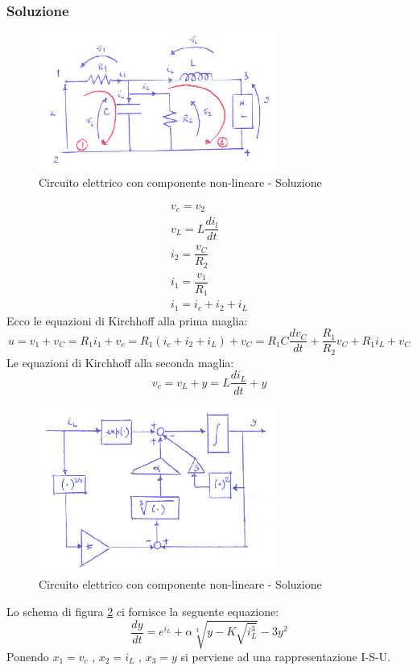 \documentclass[a4paper]{report}
\begin{document}
\subsubsection{Soluzione}
\begin{figure}[!t]
  \centering
  \includegraphics[width=0.7\textwidth]{./images/esempio03-3.png}
  \caption{Circuito elettrico con componente non-lineare - Soluzione\label{fig:esempio03-3}}
\end{figure}
\[
  \begin{array}{l}
    v_c = v_2\\
    v_L = L \dfrac{di_l}{dt}\\
    i_2 = \dfrac{v_C}{R_2}\\
    i_1 = \dfrac{v_1}{R_1}\\
    i_1 = i_c + i_2 + i_L
  \end{array}
\]
Ecco le equazioni di Kirchhoff alla prima maglia:
\[
  u = v_1 + v_C = R_1i_1 + v_c = R_1 (i_c + i_2 + i_L) + v_C = R_1C
  \dfrac{dv_C}{dt} + \dfrac{R_1}{R_2}v_C + R_1i_L + v_C
\]
Le equazioni di Kirchhoff alla seconda maglia:
\[
v_c = v_L + y = L \dfrac{di_L}{dt} + y
\]
\begin{figure}[!t]
  \centering
  \includegraphics[width=0.7\textwidth]{./images/esempio03-4.png}
  \caption{Circuito elettrico con componente non-lineare - Soluzione\label{fig:esempio03-4}}
\end{figure}
Lo schema di figura \ref{fig:esempio03-4} ci fornisce la seguente
equazione:
\[
  \dfrac{dy}{dt} = e^{i_L} + \alpha \sqrt[3]{y - K \sqrt{i_L^3}} - 3y^2
\]
Ponendo $x_1 = v_c$ , $x_2 = i_L$ , $x_3 = y$ si perviene ad una
rappresentazione I-S-U.
\end{document}
